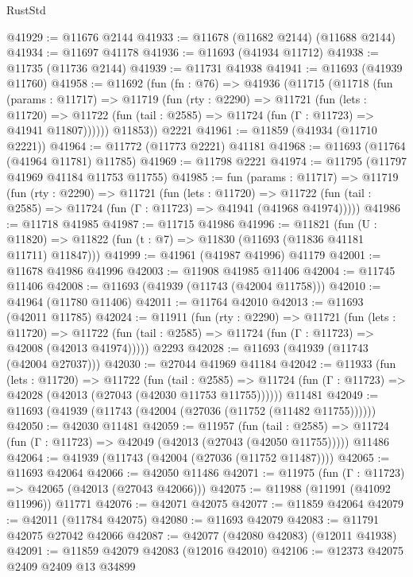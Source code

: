 \begin{lexlean}{RustStd}
\begin{coremodule}
@41929 := @11676 @2144
@41933 := @11678 (@11682 @2144) (@11688 @2144)
@41934 := @11697 @41178
@41936 := @11693 (@41934 @11712)
@41938 := @11735 (@11736 @2144)
@41939 := @11731 @41938
@41941 := @11693 (@41939 @11760)
@41958 := @11692
    (fun (fn : @76) =>
    @41936
      (@11715
        (@11718
          (fun (params : @11717) =>
          @11719
            (fun (rty : @2290) =>
            @11721
              (fun (lets : @11720) =>
              @11722 (fun (tail : @2585) => @11724 (fun (Γ : @11723) => @41941 @11807))))))
        @11853))
    @2221
@41961 := @11859 (@41934 (@11710 @2221))
@41964 := @11772 (@11773 @2221) @41181
@41968 := @11693 (@11764 (@41964 @11781) @11785)
@41969 := @11798 @2221
@41974 := @11795 (@11797 @41969 @41184 @11753 @11755)
@41985 := fun (params : @11717) =>
  @11719
    (fun (rty : @2290) =>
    @11721
      (fun (lets : @11720) =>
      @11722 (fun (tail : @2585) => @11724 (fun (Γ : @11723) => @41941 (@41968 @41974)))))
@41986 := @11718 @41985
@41987 := @11715 @41986
@41996 := @11821
    (fun (U : @11820) => @11822 (fun (t : @7) => @11830 (@11693 (@11836 @41181 @11711) @11847)))
@41999 := @41961 (@41987 @41996) @41179
@42001 := @11678 @41986 @41996
@42003 := @11908 @41985 @11406
@42004 := @11745 @11406
@42008 := @11693 (@41939 (@11743 (@42004 @11758)))
@42010 := @41964 (@11780 @11406)
@42011 := @11764 @42010
@42013 := @11693 (@42011 @11785)
@42024 := @11911
    (fun (rty : @2290) =>
    @11721
      (fun (lets : @11720) =>
      @11722 (fun (tail : @2585) => @11724 (fun (Γ : @11723) => @42008 (@42013 @41974)))))
    @2293
@42028 := @11693 (@41939 (@11743 (@42004 @27037)))
@42030 := @27044 @41969 @41184
@42042 := @11933
    (fun (lets : @11720) =>
    @11722
      (fun (tail : @2585) =>
      @11724 (fun (Γ : @11723) => @42028 (@42013 (@27043 (@42030 @11753 @11755))))))
    @11481
@42049 := @11693 (@41939 (@11743 (@42004 (@27036 (@11752 (@11482 @11755))))))
@42050 := @42030 @11481
@42059 := @11957
    (fun (tail : @2585) => @11724 (fun (Γ : @11723) => @42049 (@42013 (@27043 (@42050 @11755)))))
    @11486
@42064 := @41939 (@11743 (@42004 (@27036 (@11752 @11487))))
@42065 := @11693 @42064
@42066 := @42050 @11486
@42071 := @11975 (fun (Γ : @11723) => @42065 (@42013 (@27043 @42066)))
@42075 := @11988 (@11991 (@41092 @11996)) @11771
@42076 := @42071 @42075
@42077 := @11859 @42064
@42079 := @42011 (@11784 @42075)
@42080 := @11693 @42079
@42083 := @11791 @42075 @27042 @42066
@42087 := @42077 (@42080 @42083) (@12011 @41938)
@42091 := @11859 @42079 @42083 (@12016 @42010)
@42106 := @12373
    @42075
    @2409
    @2409
    @13
    @34899

\end{coremodule}
\end{lexlean}
